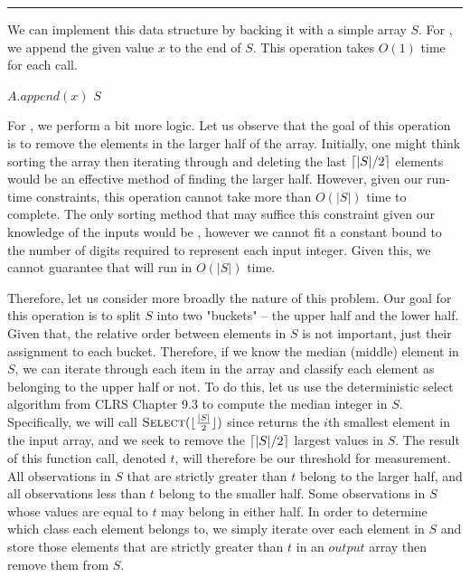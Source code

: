 \documentclass[11pt]{article}
\def\separateline{\medskip\hrule\medskip}
\DeclarePairedDelimiter{\ceil}{\lceil}{\rceil}
\DeclarePairedDelimiter\floor{\lfloor}{\rfloor}
\begin{document}
\separateline

We can implement this data structure by backing it with a simple array $S$. For , we append the given value $x$ to the end of $S$. This operation takes $O(1)$ time for each call.

\begin{codebox}
\li $A.append(x)$
\li \Return $S$
\end{codebox}

For , we perform a bit more logic. Let us observe that the goal of this operation is to remove the elements in the larger half of the array. Initially, one might think sorting the array then iterating through and deleting the last $\ceil{|S| / 2}$ elements would be an effective method of finding the larger half. However, given our run-time constraints, this operation cannot take more than $O(|S|)$ time to complete. The only sorting method that may suffice this constraint given our knowledge of the inputs would be , however we cannot fit a constant bound to the number of digits required to represent each input integer. Given this, we cannot guarantee that  will run in $O(|S|)$ time.

Therefore, let us consider more broadly the nature of this problem. Our goal for this operation is to split $S$ into two "buckets" -- the upper half and the lower half. Given that, the relative order between elements in $S$ is not important, just their assignment to each bucket. Therefore, if we know the median (middle) element in $S$, we can iterate through each item in the array and classify each element as belonging to the upper half or not. To do this, let us use the deterministic select algorithm from CLRS Chapter 9.3 to compute the median integer in $S$. Specifically, we will call $\proc{Select}(\floor{\frac{|S|}{2}})$ since  returns the $i$th smallest element in the input array, and we seek to remove the $\ceil{|S| / 2}$ largest values in $S$. The result of this function call, denoted $t$, will therefore be our threshold for measurement. All observations in $S$ that are strictly greater than $t$ belong to the larger half, and all observations less than $t$ belong to the smaller half. Some observations in $S$ whose values are equal to $t$ may belong in either half. In order to determine which class each element belongs to, we simply iterate over each element in $S$ and store those elements that are strictly greater than $t$ in an $output$ array then remove them from $S$.
\end{document}
